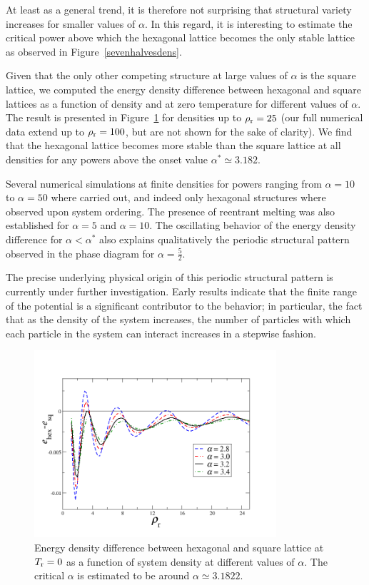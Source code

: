 {At least as a general trend, it is therefore not surprising that structural 
variety increases for smaller values of $\alpha$. In this regard, it is interesting to estimate
the critical power above which the hexagonal lattice becomes the only stable lattice as observed 
in Figure~\ref{sevenhalvesdens}.

Given that the only other competing structure at large values of $\alpha$ is the square lattice, we
computed the energy density difference between hexagonal and square lattices as a function of
density and at zero temperature for different values of $\alpha$. The result is presented
 in Figure~\ref{energies} for densities up to $\rho_{\rm r}=25$ (our full numerical data extend up
 to $\rho_{\rm r}=100$, but are not shown for the sake of clarity).
We find that the hexagonal lattice becomes more stable than the square lattice at all 
densities for any powers above the onset value $\alpha^*\simeq 3.182$. 

Several numerical simulations at finite densities for powers ranging from $\alpha=10$ to $\alpha=50$ 
where carried out, and indeed only hexagonal structures where observed upon system ordering.
The presence of reentrant melting was also established for $\alpha=5$ and $\alpha=10$.
The oscillating behavior  of the energy density difference for $\alpha<\alpha^*$ also explains 
qualitatively the periodic structural pattern observed in the phase diagram for $\alpha=\frac{5}{2}$. 

{The precise underlying physical origin of this periodic structural pattern is currently under further investigation.
Early results indicate that the finite range of the potential is a significant contributor to the behavior; in particular, the fact that as the density of the system increases, the number of particles with which each particle in the system can interact increases in a stepwise fashion.}


\begin{figure}
\begin{center}\includegraphics[width=0.8\textwidth]{2dsoft/energies.png}\end{center}
\caption[Energy density difference between hexagonal and square lattices vs. $\alpha$]{Energy density difference between hexagonal and square lattice at $T_{\rm r}=0$ as a 
function of system density at different values of $\alpha$. The 
critical $\alpha$ is estimated to be around $\alpha\simeq 3.1822$.}
\label{energies}
\end{figure}

}
